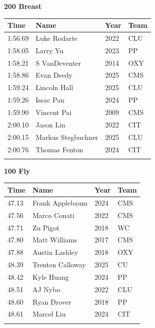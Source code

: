 \vspace{1.2em}
\noindent\begin{minipage}[t]{0.98\textwidth}
\centering
\textbf{\textcolor{teamprimary}{200 Breast}}\par
\vspace{0.5em}
\centering
\small
\renewcommand{\arraystretch}{1.0}
\setlength{\tabcolsep}{4pt}
\begin{tabular}{@{}p{2.5cm}p{4.5cm}p{1.5cm}p{2.5cm}@{}}
\toprule
\textbf{Time} & \textbf{Name} & \textbf{Year} & \textbf{Team} \\
\midrule
1:56.69 & Luke Rodarte & 2022 & CLU \\
1:58.05 & Larry Yu & 2023 & PP \\
1:58.21 & S VanDeventer & 2014 & OXY \\
1:58.86 & Evan Deedy & 2025 & CMS \\
1:59.24 & Lincoln Hall & 2025 & CLU \\
1:59.26 & Issac Pan & 2024 & PP \\
1:59.90 & Vincent Pai & 2009 & CMS \\
2:00.10 & Jason Lin & 2022 & CIT \\
2:00.15 & Markus Stegbuchner & 2025 & CLU \\
2:00.76 & Thomas Fenton & 2024 & CIT \\
\bottomrule
\vspace{0.5em}
\end{tabular}
\end{minipage}
\vspace{1.2em}
\noindent\begin{minipage}[t]{0.98\textwidth}
\centering
\textbf{\textcolor{teamprimary}{100 Fly}}\par
\vspace{0.5em}
\centering
\small
\renewcommand{\arraystretch}{1.0}
\setlength{\tabcolsep}{4pt}
\begin{tabular}{@{}p{2.5cm}p{4.5cm}p{1.5cm}p{2.5cm}@{}}
\toprule
\textbf{Time} & \textbf{Name} & \textbf{Year} & \textbf{Team} \\
\midrule
47.13 & Frank Applebaum & 2024 & CMS \\
47.56 & Marco Conati & 2022 & CMS \\
47.71 & Zu Pigot & 2018 & WC \\
47.80 & Matt Williams & 2017 & CMS \\
47.88 & Austin Lashley & 2018 & OXY \\
48.39 & Trenten Calloway & 2025 & CU \\
48.42 & Kyle Huang & 2024 & PP \\
48.51 & AJ Nybo & 2022 & CLU \\
48.60 & Ryan Drover & 2018 & PP \\
48.61 & Marcel Liu & 2024 & CIT \\
\bottomrule
\vspace{0.5em}
\end{tabular}
\end{minipage}
